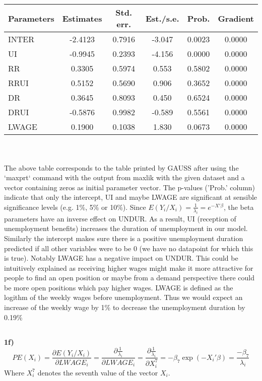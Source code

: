 \documentclass[11pt]{article}
\theoremstyle{break}
\begin{document}
\subsection{}
\begin{tabular}{ l | c c c c c }
Parameters & Estimates & Std. err. & Est./s.e. & Prob. & Gradient \\
\hline
	INTER & -2.4123 & 0.7916 & -3.047 & 0.0023 & 0.0000 \\
	UI & -0.9945 & 0.2393 & -4.156 & 0.0000 & 0.0000 \\
	RR & 0.3305 & 0.5974 & 0.553 & 0.5802 & 0.0000 \\
	RRUI & 0.5152 & 0.5690 & 0.906 & 0.3652 & 0.0000 \\
	DR & 0.3645 & 0.8093 & 0.450 & 0.6524 & 0.0000 \\
	DRUI & -0.5876 & 0.9982 & -0.589 & 0.5561 & 0.0000 \\
	LWAGE & 0.1900 & 0.1038 & 1.830 & 0.0673 & 0.0000 \\
\end{tabular}
\\ 
\\ 
The above table corresponds to the table printed by GAUSS after using the `maxprt` command with the output from maxlik with the given dataset and a vector containing zeros as initial parameter vector. The p-values ('Prob.' column) indicate that only the intercept, UI and maybe LWAGE are significant at sensible significance levels (e.g. 1\%, 5\% or 10\%). Since $E(Y_i/X_i) = \frac{1}{\lambda_i} = e^{-X'\beta}$, the beta parameters have an inverse effect on UNDUR. As a result, UI (reception of unemployment benefits) increases the duration of unemployment in our model. Similarly the intercept makes sure there is a positive unemployment duration predicted if all other variables were to be 0 (we have no datapoint for which this is true). Notably LWAGE has a negative impact on UNDUR. This could be intuitively explained as receiving higher wages might make it more attractive for people to find an open position or maybe from a demand perspective there could be more open positions which pay higher wages. LWAGE is defined as the logithm of the weekly wages before unemployment. Thus we would expect an increase of the weekly wage by 1\% to decrease the unemployment duration by 0.19\%

\subsection{}

\textbf{1f)}
$$PE(X_i) = \frac{\partial E(Y_i/X_i)}{\partial LWAGE_i} = \frac{\partial{\frac{1}{\lambda_i}}}{\partial LWAGE_i} = \frac{\partial{\frac{1}{\lambda_i}}}{\partial X_i^7} = -\beta_7\exp(-X_i'\beta) = \frac{-\beta_7}{\lambda_i}$$ Where $X_i^7$ denotes the seventh value of the vector $X_i$.
\end{document}
